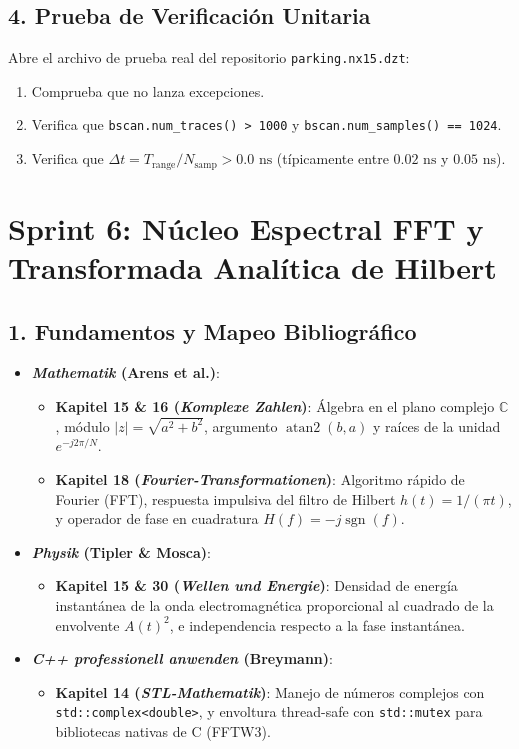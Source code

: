 \documentclass[11pt,a4paper]{article}
\begin{document}
\subsection{4. Prueba de Verificación Unitaria}
Abre el archivo de prueba real del repositorio \texttt{parking.nx15.dzt}:
\begin{enumerate}
    \item Comprueba que no lanza excepciones.
    \item Verifica que \texttt{bscan.num\_traces() > 1000} y \texttt{bscan.num\_samples() == 1024}.
    \item Verifica que $\Delta t = T_{\text{range}} / N_{\text{samp}} > 0.0\text{ ns}$ (típicamente entre $0.02\text{ ns}$ y $0.05\text{ ns}$).
\end{enumerate}

\section{Sprint 6: Núcleo Espectral FFT y Transformada Analítica de Hilbert}

\subsection{1. Fundamentos y Mapeo Bibliográfico}
\begin{itemize}
    \item \textbf{\textit{Mathematik} (Arens et al.)}:
    \begin{itemize}
        \item \textbf{Kapitel 15 \& 16 (\textit{Komplexe Zahlen})}: Álgebra en el plano complejo $\mathbb{C}$, módulo $|z| = \sqrt{a^2 + b^2}$, argumento $\operatorname{atan2}(b, a)$ y raíces de la unidad $e^{-j 2\pi / N}$.
        \item \textbf{Kapitel 18 (\textit{Fourier-Transformationen})}: Algoritmo rápido de Fourier (FFT), respuesta impulsiva del filtro de Hilbert $h(t) = 1/(\pi t)$, y operador de fase en cuadratura $H(f) = -j\operatorname{sgn}(f)$.
    \end{itemize}
    \item \textbf{\textit{Physik} (Tipler \& Mosca)}:
    \begin{itemize}
        \item \textbf{Kapitel 15 \& 30 (\textit{Wellen und Energie})}: Densidad de energía instantánea de la onda electromagnética proporcional al cuadrado de la envolvente $A(t)^2$, e independencia respecto a la fase instantánea.
    \end{itemize}
    \item \textbf{\textit{C++ professionell anwenden} (Breymann)}:
    \begin{itemize}
        \item \textbf{Kapitel 14 (\textit{STL-Mathematik})}: Manejo de números complejos con \texttt{std::complex<double>}, y envoltura thread-safe con \texttt{std::mutex} para bibliotecas nativas de C (FFTW3).
    \end{itemize}
\end{itemize}
\end{document}
